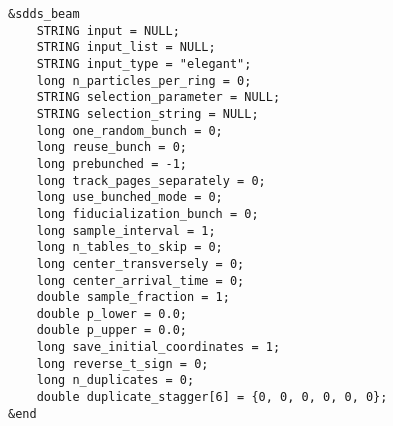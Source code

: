 \documentclass[11pt]{article}
\begin{document}
\begin{verbatim}
&sdds_beam
    STRING input = NULL;
    STRING input_list = NULL;
    STRING input_type = "elegant";
    long n_particles_per_ring = 0;
    STRING selection_parameter = NULL;
    STRING selection_string = NULL;
    long one_random_bunch = 0;
    long reuse_bunch = 0;
    long prebunched = -1;
    long track_pages_separately = 0;
    long use_bunched_mode = 0;
    long fiducialization_bunch = 0;
    long sample_interval = 1;
    long n_tables_to_skip = 0;
    long center_transversely = 0;
    long center_arrival_time = 0;
    double sample_fraction = 1;
    double p_lower = 0.0;
    double p_upper = 0.0;
    long save_initial_coordinates = 1;
    long reverse_t_sign = 0;
    long n_duplicates = 0;
    double duplicate_stagger[6] = {0, 0, 0, 0, 0, 0};
&end
\end{verbatim}
\end{document}
